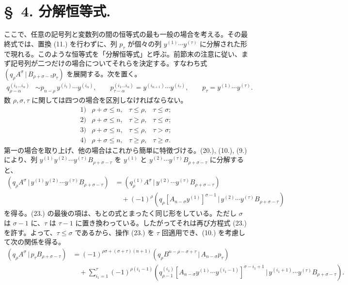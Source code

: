 \documentclass[11pt]{jlreq}
\newcommand{\pair}[2]{(#1\,|\,#2)}
\begin{document}
\section*{\S\ 4. 分解恒等式.}
ここで、任意の記号列と変数列の間の恒等式の最も一般の場合を考える。その最終式では、置換 (11.) を行わずに、列 $p_\tau$ が個々の列 $y^{(1)}\cdots y^{(\tau)}$ に分解された形で現れる。このような恒等式を「分解恒等式」と呼ぶ。前節末の注意に従い、まず記号列が二つだけの場合についてそれらを決定する。すなわち式 $\pair{q_\rho A^\sigma}{B_{\rho+\sigma-\tau}p_\tau}$ を展開する。次を置く。
\begin{equation}
\begin{aligned}
q_{\rho-\alpha}^{(i_1\ldots i_\alpha)}&\sim p_{n-\rho}\,y^{(i_1)}\cdots y^{(i_\alpha)},\qquad
p_{\tau-\alpha}^{(i_1\ldots i_\alpha)}=y^{(i_{\alpha+1})}\cdots y^{(i_\tau)},\qquad
p_\tau=y^{(1)}\cdots y^{(\tau)}.
\end{aligned}
\tag{22}
\end{equation}
数 $\rho,\sigma,\tau$ に関しては四つの場合を区別しなければならない。
\[
\begin{array}{llll}
1)&\rho+\sigma\le n,& \tau\le\rho,& \tau\le\sigma;\\[2pt]
2)&\rho+\sigma\le n,& \tau\ge\rho,& \tau\le\sigma;\\[2pt]
3)&\rho+\sigma\le n,& \tau\le\rho,& \tau>\sigma;\\[2pt]
4)&\rho+\sigma\le n,& \tau\ge\rho,& \tau\ge\sigma.
\end{array}
\]
第一の場合を取り上げ、他の場合はこれから簡単に特徴づける。(20.), (10.), (9.) により、列 $y^{(1)}y^{(2)}\cdots y^{(\tau)}B_{\rho+\sigma-\tau}$ を $y^{(1)}$ と $y^{(2)}\cdots y^{(\tau)}B_{\rho+\sigma-\tau}$ に分解すると、
\begin{equation}
\begin{aligned}
\pair{q_\rho A^\sigma}{y^{(1)}y^{(2)}\cdots y^{(\tau)}B_{\rho+\sigma-\tau}}
&=\pair{q_\rho^{(1)}A^\sigma}{y^{(2)}\cdots y^{(\tau)}B_{\rho+\sigma-\tau}}\\
&\quad+(-1)^\rho\pair{q_\rho[A_{n-\sigma}y^{(1)}]^{\sigma-1}}{y^{(2)}\cdots y^{(\tau)}B_{\rho+\sigma-\tau}}
\end{aligned}
\tag{23}
\end{equation}
を得る。(23.) の最後の項は、もとの式とまったく同じ形をしている。ただし $\sigma$ は $\sigma-1$ に、$\tau$ は $\tau-1$ に置き換わっている。したがってそれは再び方程式 (23.) を許す。よって、$\tau\le\sigma$ であるから、操作 (23.) を $\tau$ 回適用でき、(10.) を考慮して次の関係を得る。
\begin{equation}
\begin{aligned}
\pair{q_\rho A^\sigma}{p_\tau B_{\rho+\sigma-\tau}}
&=(-1)^{\rho\sigma+(\sigma+\tau)(n+1)}
  \pair{q_\rho B^{n-\rho-\sigma+\tau}}{A_{n-\sigma}p_\tau}\\
&\quad+\sum_{i_1=1}^{\tau}(-1)^{\rho(i_1-1)}
 \pair{q_{\rho-1}^{(i_1)}[A_{n-\sigma}y^{(1)}\cdots y^{(i_1-1)}]^{\sigma-i_1+1}}
 {y^{(i_1+1)}\cdots y^{(\tau)}B_{\rho+\sigma-\tau}}.
\end{aligned}
\tag{24}
\end{equation}
\end{document}
